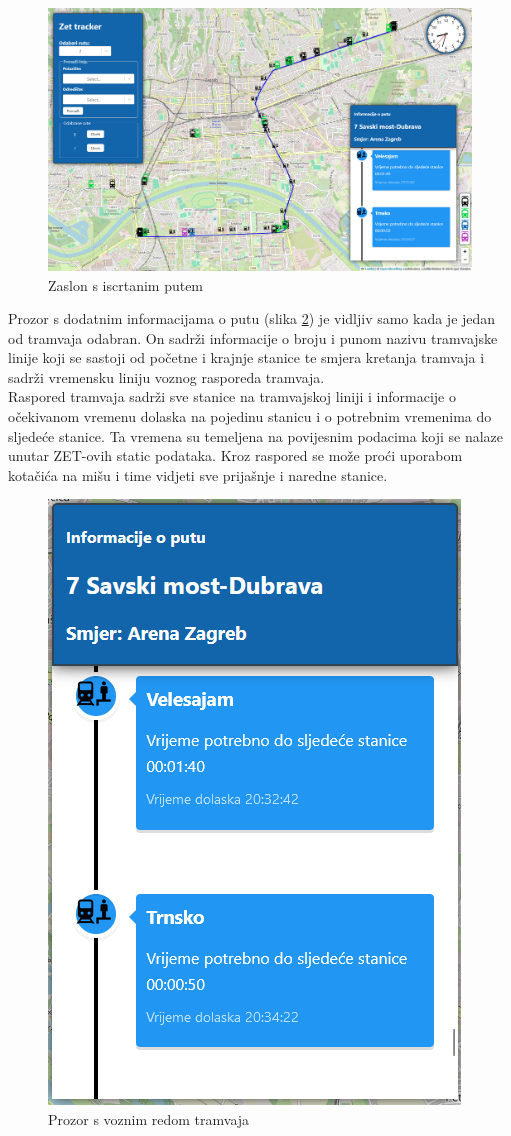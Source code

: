 \documentclass[zavrsnirad]{fer}
\begin{document}
\begin{figure}[H]
	\centering
	\includegraphics[width=\linewidth]{Figures/primjer1.png} 
	\caption{Zaslon s iscrtanim putem}
	\label{slk:put}
\end{figure}
\newpage
Prozor s dodatnim informacijama o putu (slika \ref{slk:inf}) je vidljiv samo kada je jedan od tramvaja odabran. On sadrži informacije o broju i punom nazivu tramvajske linije koji se sastoji od početne i krajnje stanice te smjera kretanja tramvaja i sadrži vremensku liniju voznog rasporeda tramvaja.\\Raspored tramvaja sadrži sve stanice na tramvajskoj liniji i informacije o očekivanom vremenu dolaska na pojedinu stanicu i o potrebnim vremenima do sljedeće stanice. Ta vremena su temeljena na povijesnim podacima koji se nalaze unutar ZET-ovih static podataka. Kroz raspored se može proći uporabom kotačića na mišu i time vidjeti sve prijašnje i naredne stanice.

\begin{figure}[H]
	\centering
	\includegraphics[width=0.4\linewidth]{Figures/informacije.png} 
	\caption{Prozor s voznim redom tramvaja}
	\label{slk:inf}
\end{figure}
\end{document}
